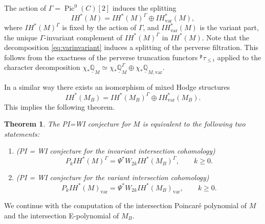 \documentclass[JEP,XML,SOM,Unicode, NoEqCountersInSection,NoFloatCountersInSection,published]{cedram}
\newcommand{\IH}{\mathit{IH}}
\newtheorem{thm}{Theorem}[section]
\theoremstyle{definition}
\newcommand{\QQ}{\mathbb{Q}}
\newcommand{\Pic}{\operatorname{Pic}}
\begin{document}
The action of $\Gamma = \Pic^0(C)[2]$ induces the splitting
\begin{equation}\label{eq:varinvariant}
\IH^*(M) = \IH^*(M)^{\Gamma} \oplus \IH_{\mathrm{var}}^*(M),
\end{equation}
where $\IH^*(M)^{\Gamma}$ is fixed by the action of $\Gamma$, and $\IH_{\mathrm{var}}^*(M)$ is the {variant} part, \ie the unique $\Gamma$-invariant complement of $\IH^*(M)^{\Gamma}$ in $\IH^*(M)$. Note that the decomposition \eqref{eq:varinvariant} induces a splitting of the perverse filtration. This follows from the exactness of the perverse truncation functors $^{\mathfrak{p}}\tau_{\leq i}$ applied to the character decomposition $\chi_*\underline{\QQ}_M \simeq \chi_*\underline{\QQ}^{\Gamma}_M \oplus \chi_*\underline{\QQ}_{M, \mathrm{var}}$.

In a similar way there exists an isomorphism of mixed Hodge structures
\[
\IH^*(M_B) = \IH^*(M_B)^{\Gamma} \oplus \IH_{\mathrm{var}}^*(M_B).
\]
This implies the following theorem.

\pagebreak[2]
\begin{thm}\label{Thm:PWinv and var}
The PI=WI conjecture for $M$ is equivalent to the following two statements:
\begin{enumerate}
\item \emph{(PI = WI conjecture for the invariant intersection cohomology)}
\begin{equation}\label{eq:invariantPIWI}
P_k\IH^*(M)^{\Gamma}= \Psi^* W_{2k}\IH^*(M_B)^{\Gamma}, \qquad k \geq 0.
\end{equation}
\item \emph{(PI = WI conjecture for the variant intersection cohomology)}
\begin{equation}\label{eq:variantPIWI}
P_k\IH^*(M)_{\mathrm{var}}= \Psi^* W_{2k}\IH^*(M_B)_{\mathrm{var}}, \qquad k \geq 0.
\end{equation}
\end{enumerate}
\end{thm}

We continue with the computation of the intersection Poincaré polynomial of $M$ and the intersection E-polynomial of $M_B$.
\end{document}
